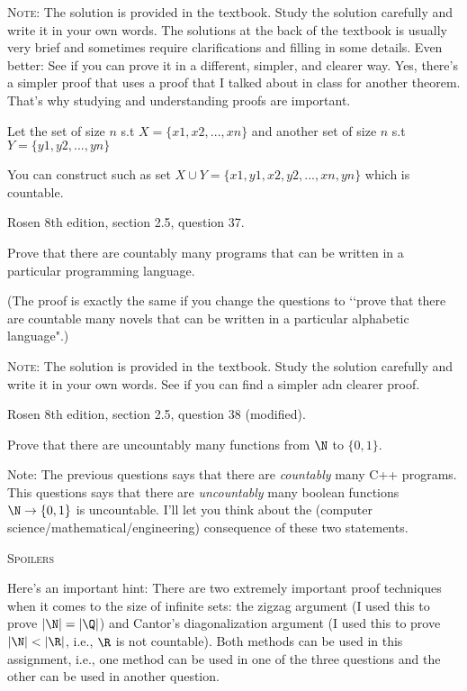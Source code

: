 \textsc{Note:} The solution is provided in the textbook.
Study the solution carefully and write it in your own words.
The solutions at the back of the textbook is usually very brief and
sometimes require clarifications and filling in some details.
Even better: See if you can prove it in a different, simpler, and clearer way.
Yes, there's a simpler proof that uses a proof that I talked about in class
for another theorem.
That's why studying and understanding proofs are important. 

\SOLUTION

Let the set of size $n$ s.t $X = \{x1,x2,...,xn\}$ and another set of size $n$ s.t $Y = \{y1,y2,...,yn\}$

You can construct such as set $ X \cup Y = \{x1,y1,x2,y2,...,xn,yn\}$ which is countable.



\newpage
\nextq Rosen 8th edition, section 2.5, question 37.

Prove that there are countably many programs that can be written in a
particular programming language.

(The proof is exactly the same if you change the questions to \lq\lq prove
that there are countable many novels that can be written in a particular
alphabetic language".)

\textsc{Note:} The solution is provided in the textbook.
Study the solution carefully and write it in your own words.
See if you can find a simpler adn clearer proof.

\SOLUTION



\newpage
\nextq Rosen 8th edition, section 2.5, question 38 (modified).

Prove that there are uncountably many functions from $\N$ to $\{ 0, 1 \}$.

Note: The previous questions says that there are \textit{countably}
many C++ programs.
This questions says that there are \textit{uncountably} many boolean functions
$\N \rightarrow \{0,1\}$ is uncountable.
I'll let you think about the (computer science/mathematical/engineering) consequence of these two statements.

\SOLUTION



\newpage
\textsc{Spoilers}

Here's an important hint:
There are two extremely important proof techniques when it comes to
the size of infinite sets:
the zigzag argument (I used this to prove $|\N| = |\Q|$)
and Cantor's diagonalization argument (I used this to prove $|\N| < |\R|$,
i.e., $\R$ is not countable).
Both methods can be used in this assignment, i.e.,
one method can be used in one of the three questions
and the other can be used in another question.

\newpage


